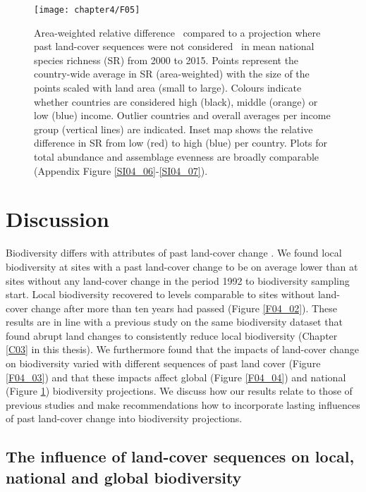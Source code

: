 \begin{figure}[ht]
\centering
\texttt{[image: chapter4/F05]}
\caption{ Area-weighted relative difference \textendash\ compared to a projection where past land-cover sequences were not considered \textendash\ in mean national species richness (SR) from 2000 to 2015. Points represent the country-wide average in SR (area-weighted) with the size of the points scaled with land area (small to large). Colours indicate whether countries are considered high (black), middle (orange) or low (blue) income. Outlier countries and overall averages per income group (vertical lines) are indicated. Inset map shows the relative difference in SR from low (red) to high (blue) per country. Plots for total abundance and assemblage evenness are broadly comparable (Appendix Figure \ref{SI04_06}-\ref{SI04_07}). }
\label{F04_05}
\end{figure}

\section{Discussion}
\label{C04_04}

Biodiversity differs with attributes of past land-cover change \citep{Watson2014}. We found local biodiversity at sites with a past land-cover change to be on average lower than at sites without any land-cover change in the period 1992 to biodiversity sampling start. Local biodiversity recovered to levels comparable to sites without land-cover change after more than ten years had passed (Figure \ref{F04_02}). These results are in line with a previous study on the same biodiversity dataset that found abrupt land changes to consistently reduce local biodiversity (Chapter \ref{C03} in this thesis). We furthermore found that the impacts of land-cover change on biodiversity varied with different sequences of past land cover (Figure \ref{F04_03}) and that these impacts affect global (Figure \ref{F04_04}) and national (Figure \ref{F04_05}) biodiversity projections. We discuss how our results relate to those of previous studies and make recommendations how to incorporate lasting influences of past land-cover change into biodiversity projections.

\subsection{The influence of land-cover sequences on local, national and global biodiversity}
\label{C04_0401}

